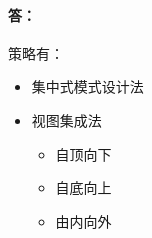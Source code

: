 \paragraph{答：}
策略有：
\begin{itemize}
	\item 集中式模式设计法
	\item 视图集成法
	\begin{itemize}
		\item 自顶向下
		\item 自底向上
		\item 由内向外
	\end{itemize}
\end{itemize}